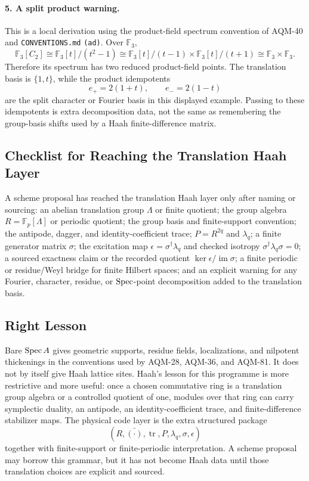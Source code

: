 \paragraph{5. A split product warning.}
This is a local derivation using the product-field spectrum convention of
AQM-40 and \texttt{CONVENTIONS.md} \texttt{(ad)}.  Over \(\mathbb F_3\),
\[
  \mathbb F_3[C_2]\cong \mathbb F_3[t]/(t^2-1)
  \cong \mathbb F_3[t]/(t-1)\times\mathbb F_3[t]/(t+1)
  \cong\mathbb F_3\times\mathbb F_3.
\]
Therefore its spectrum has two reduced product-field points.  The translation
basis is \(\{1,t\}\), while the product idempotents
\[
  e_+=2(1+t),\qquad e_-=2(1-t)
\]
are the split character or Fourier basis in this displayed example.  Passing
to these idempotents is extra decomposition data, not the same as remembering
the group-basis shifts used by a Haah finite-difference matrix.

\subsection{Checklist for Reaching the Translation Haah Layer}

A scheme proposal has reached the translation Haah layer only after naming or
sourcing: an abelian translation group \(\Lambda\) or finite quotient; the
group algebra \(R=\mathbb F_p[\Lambda]\) or periodic quotient; the group basis
and finite-support convention; the antipode, dagger, and identity-coefficient
trace; \(P=R^{2q}\) and \(\lambda_q\); a finite generator matrix \(\sigma\);
the excitation map \(\epsilon=\sigma^\dagger\lambda_q\) and checked isotropy
\(\sigma^\dagger\lambda_q\sigma=0\); a sourced exactness claim or the
recorded quotient \(\ker\epsilon/\operatorname{im}\sigma\); a finite periodic
or residue/Weyl bridge for finite Hilbert spaces; and an explicit warning for
any Fourier, character, residue, or \(\operatorname{Spec}\)-point decomposition added to the
translation basis.

\subsection{Right Lesson}

Bare \(\operatorname{Spec} A\) gives geometric supports, residue fields, localizations, and
nilpotent thickenings in the conventions used by AQM-28, AQM-36, and AQM-81.
It does not by itself give Haah lattice sites.  Haah's lesson for this
programme is more restrictive and more useful: once a chosen commutative ring
is a translation group algebra or a controlled quotient of one, modules over
that ring can carry symplectic duality, an antipode, an identity-coefficient
trace, and finite-difference stabilizer maps.  The physical code layer is the
extra structured package
\[
  (R,\bar{(\cdot)},\operatorname{tr},P,\lambda_q,\sigma,\epsilon)
\]
together with finite-support or finite-periodic interpretation.  A scheme
proposal may borrow this grammar, but it has not become Haah data until those
translation choices are explicit and sourced.
